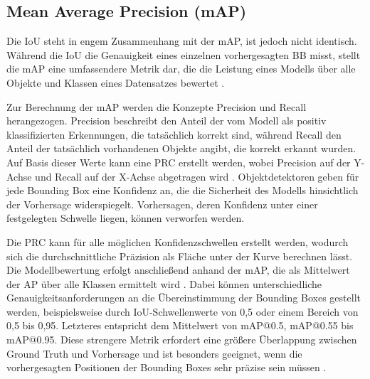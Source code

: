 \subsection{Mean Average Precision (mAP)}

Die \acrlong{IoU} steht in engem Zusammenhang mit der \acrfull{mAP}, ist jedoch nicht identisch. Während die \acrshort{IoU} die Genauigkeit eines einzelnen vorhergesagten \acrshort{BB} misst, stellt die \acrshort{mAP} eine umfassendere Metrik dar, die die Leistung eines Modells über alle Objekte und Klassen eines Datensatzes bewertet \cite{ultralyics_iou}.

Zur Berechnung der \acrshort{mAP} werden die Konzepte Precision und Recall herangezogen. Precision beschreibt den Anteil der vom Modell als positiv klassifizierten Erkennungen, die tatsächlich korrekt sind, während Recall den Anteil der tatsächlich vorhandenen Objekte angibt, die korrekt erkannt wurden. Auf Basis dieser Werte kann eine \acrfull{PRC} erstellt werden, wobei Precision auf der Y-Achse und Recall auf der X-Achse abgetragen wird \cite{Goodfellow-et-al-2016}. Objektdetektoren geben für jede Bounding Box eine Konfidenz an, die die Sicherheit des Modells hinsichtlich der Vorhersage widerspiegelt. Vorhersagen, deren Konfidenz unter einer festgelegten Schwelle liegen, können verworfen werden. 

Die \acrshort{PRC} kann für alle möglichen Konfidenzschwellen erstellt werden, wodurch sich die durchschnittliche Präzision als Fläche unter der Kurve berechnen lässt. Die Modellbewertung erfolgt anschließend anhand der \acrfull{mAP}, die als Mittelwert der \acrfull{AP} über alle Klassen ermittelt wird \cite{Rainio2024}. Dabei können unterschiedliche Genauigkeitsanforderungen an die Übereinstimmung der Bounding Boxes gestellt werden, beispielsweise durch IoU-Schwellenwerte von 0,5 oder einem Bereich von 0,5 bis 0,95. Letzteres entspricht dem Mittelwert von \acrshort{mAP}@0.5, \acrshort{mAP}@0.55 bis \acrshort{mAP}@0.95. Diese strengere Metrik erfordert eine größere Überlappung zwischen Ground Truth und Vorhersage und ist besonders geeignet, wenn die vorhergesagten Positionen der Bounding Boxes sehr präzise sein müssen \cite{Rainio2024}.

